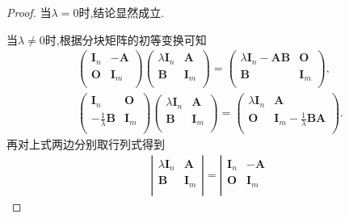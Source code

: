 \documentclass[../../main.tex]{subfiles}
\begin{document}
\begin{proof}
当$\lambda=0$时,结论显然成立.

当$\lambda\ne 0$时,根据分块矩阵的初等变换可知
\begin{gather*}
\left( \begin{matrix}
\boldsymbol{I}_n&		-\boldsymbol{A}\\
\boldsymbol{O}&		\boldsymbol{I}_m\\
\end{matrix} \right) \left( \begin{matrix}
\lambda \boldsymbol{I}_n&		\boldsymbol{A}\\
\boldsymbol{B}&		\boldsymbol{I}_m\\
\end{matrix} \right) =\left( \begin{matrix}
\lambda \boldsymbol{I}_n-\boldsymbol{AB}&		\boldsymbol{O}\\
\boldsymbol{B}&		\boldsymbol{I}_m\\
\end{matrix} \right) ,
\\
\left( \begin{matrix}
\boldsymbol{I}_n&		\boldsymbol{O}\\
-\frac{1}{\lambda}\boldsymbol{B}&		\boldsymbol{I}_m\\
\end{matrix} \right) \left( \begin{matrix}
\lambda \boldsymbol{I}_n&		\boldsymbol{A}\\
\boldsymbol{B}&		\boldsymbol{I}_m\\
\end{matrix} \right) =\left( \begin{matrix}
\lambda \boldsymbol{I}_n&		\boldsymbol{A}\\
\boldsymbol{O}&		\boldsymbol{I}_m-\frac{1}{\lambda}\boldsymbol{BA}\\
\end{matrix} \right) .
\end{gather*}
再对上式两边分别取行列式得到
\begin{gather*}
\left| \begin{matrix}
\lambda \boldsymbol{I}_n&		\boldsymbol{A}\\
\boldsymbol{B}&		\boldsymbol{I}_m\\
\end{matrix} \right|=\left| \begin{matrix}
\boldsymbol{I}_n&		-\boldsymbol{A}\\
\boldsymbol{O}&		\boldsymbol{I}_m\\

\end{matrix}
\end{gather*}
\end{proof}
\end{document}
